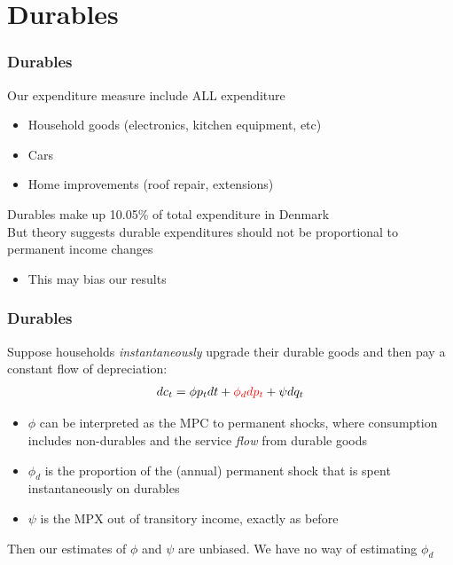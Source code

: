 \documentclass{beamer}
\begin{document}
\section{Durables}
\frame
{
	\frametitle{Durables}
	Our expenditure measure include ALL expenditure
	\begin{itemize}
		\item Household goods (electronics, kitchen equipment, etc)
		\item Cars
		\item Home improvements (roof repair, extensions)
	\end{itemize}
	Durables make up 10.05\% of total expenditure in Denmark\\
	\pause
	\bigskip
	But theory suggests durable expenditures should not be proportional to permanent income changes 
	\begin{itemize}
		\item This may bias our results
	\end{itemize}
}
\frame
{
	\frametitle{Durables}
	Suppose households \textit{instantaneously} upgrade their durable goods and then pay a constant flow of depreciation:
	\begin{align*}
	dc_t = \phi p_t dt + \color{red} \phi_{d} dp_t \color{black} + \psi dq_t
	\end{align*}
	\begin{itemize}
		\item $\phi$ can be interpreted as the MP\color{red}C \color{black}to permanent shocks, where consumption includes non-durables and the service \textit{flow} from durable goods
		\item $\phi_{d}$ is the proportion of the (annual) permanent shock that is spent instantaneously on durables
		\item $\psi$ is the MPX out of transitory income, exactly as before
	\end{itemize}
	\pause
	Then our estimates of $\phi$ and $\psi$ are unbiased. We have no way of estimating $\phi_d$
}
\frame
\end{document}
